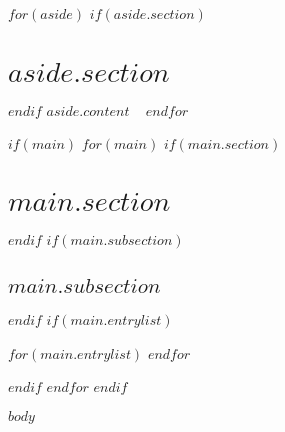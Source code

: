 \documentclass{friggeri-cv-a4}
\begin{document}



\begin{aside}
$for(aside)$
$if(aside.section)$
\section{$aside.section$}
$endif$
$aside.content$
~
$endfor$
\end{aside}

$if(main)$
$for(main)$
$if(main.section)$
\section{$main.section$}
$endif$
$if(main.subsection)$
\subsection{$main.subsection$}
$endif$
$if(main.entrylist)$
\begin{entrylist}
$for(main.entrylist)$
$endfor$
\end{entrylist}
$endif$
$endfor$
$endif$

$body$
\end{document}
